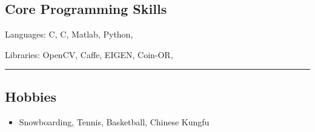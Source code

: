 \documentclass[10pt,letterpaper]{article}
\newenvironment{indentsection}[1]%
{\begin{list}{}%
	{\setlength{\leftmargin}{#1}}%
	\item[]%
}
{\end{list}}
\newcommand{\CPP}
{C\nolinebreak[4]\hspace{-.05em}\raisebox{.22ex}{\footnotesize\bf ++}}
\begin{document}
\subsection*{Core Programming Skills}

\begin{indentsection}{\parindent}
\begin{description*}
	\item[Languages:]
	C, \CPP, Matlab, Python,
	\item[Libraries:]
    OpenCV, Caffe, EIGEN, Coin-OR,
\end{description*}
\end{indentsection}

\hrule
\vspace{-0.4em}
\subsection*{Hobbies}
\begin{itemize}
\item Snowboarding, Tennis, Basketball, Chinese Kungfu
\end{itemize}
\end{document}
